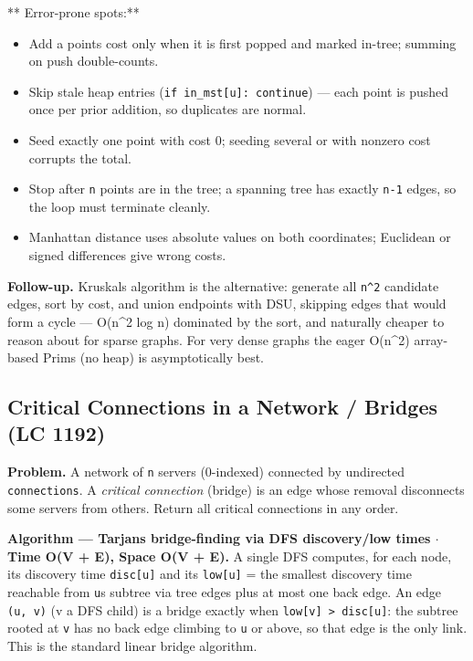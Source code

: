 \documentclass[11pt]{article}
\providecommand{\tightlist}{\setlength{\itemsep}{1pt}\setlength{\parskip}{0pt}}
\begin{document}
** Error-prone spots:**

\begin{itemize}
\tightlist
\item
  Add a point\textquotesingle s cost only when it is first popped and marked in-tree; summing on push double-counts.
\item
  Skip stale heap entries (\texttt{if\ in\_mst{[}u{]}:\ continue}) --- each point is pushed once per prior addition, so duplicates are normal.
\item
  Seed exactly one point with cost 0; seeding several or with nonzero cost corrupts the total.
\item
  Stop after \texttt{n} points are in the tree; a spanning tree has exactly \texttt{n-1} edges, so the loop must terminate cleanly.
\item
  Manhattan distance uses absolute values on both coordinates; Euclidean or signed differences give wrong costs.
\end{itemize}

\textbf{Follow-up.} Kruskal\textquotesingle s algorithm is the alternative: generate all \texttt{n\^{}2} candidate edges, sort by cost, and union endpoints with DSU, skipping edges that would form a cycle --- O(n\^{}2 log n) dominated by the sort, and naturally cheaper to reason about for sparse graphs. For very dense graphs the eager O(n\^{}2) array-based Prim\textquotesingle s (no heap) is asymptotically best.

\subsection{Critical Connections in a Network / Bridges (LC 1192)}\label{critical-connections-in-a-network--bridges-lc-1192}

\textbf{Problem.} A network of \texttt{n} servers (0-indexed) connected by undirected \texttt{connections}. A \emph{critical connection} (bridge) is an edge whose removal disconnects some servers from others. Return all critical connections in any order.

\textbf{Algorithm --- Tarjan\textquotesingle s bridge-finding via DFS discovery/low times \(\cdot\) Time O(V + E), Space O(V + E).} A single DFS computes, for each node, its discovery time \texttt{disc{[}u{]}} and its \texttt{low{[}u{]}} = the smallest discovery time reachable from \texttt{u}\textquotesingle s subtree via tree edges plus at most one back edge. An edge \texttt{(u,\ v)} (v a DFS child) is a bridge exactly when \texttt{low{[}v{]}\ \textgreater{}\ disc{[}u{]}}: the subtree rooted at \texttt{v} has no back edge climbing to \texttt{u} or above, so that edge is the only link. This is the standard linear bridge algorithm.
\end{document}
